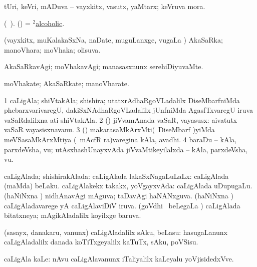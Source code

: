 \bentry
{}
\gl{\nA}
\bmng
tUri, keVri, mADuva -- vayxkitx, vasutx, yaMtarx; keVruva mora. 
\emng
\eentry

\bentry
{}
\gl{\nA} (\bava\ ). 
\bmng
(\ashi) = \hyperref{kandict_a.pdf}{A}{alcoholic(2)}{$^2$alcoholic}. 
\emng
\eentry

\bentry
{}
\gl{\gu}
\bmng
(vayxkitx, muKalakaSxNa, naDate, muguLanxge, \mo vugaLa \vi) AkaSaRka; manoVhara; moVhaka; olisuva. 
\emng
\eentry

\bentry
{}
\gl{\kirxvi}
\bmng
AkaSaRkavAgi; moVhakavAgi; manasasxnunx serehiDiyuvaMte. 
\emng
\eentry

\bentry
{}
\gl{\nA}
\bmng
moVhakate; AkaSaRkate; manoVharate. 
\emng
\eentry

\bentry
{} 
\gl{\nA}
\expl{}
\bmng
\bnum
\num{1} caLigAla; shiVtakAla; shishira; utatxrAdhaRgoVLadalilx DiseMbarfniMda phebarxvarivaregU, dakiSxNAdhaRgoVLadalilx jUnfniMda AgasfTxvaregU iruva vaSaRdalilxna ati shiVtakAla. 
\num{2} (\kAparx) jiVvamAnada vaSaR, vayasusx:  aivatutx vaSaR vayasisxnavanu. 
\num{3} (\Kavi) makarasaMkArxMti(\su\ DiseMbarf )yiMda meVSasaMkArxMtiya (\su\ mAcfR ra)varegina kAla, avadhi. 
\num{4} baraDu -- kAla, parxdeVsha, \mo vu; utAsxhashUnayxvAda jiVvaMtikeyilalxda -- kAla, parxdeVsha, \mo vu. 
\enum
\emng
\eentry

\bentry
{} 
\gl{\gu}
\bmng
caLigAlada; shishirakAlada: 
\banum
{} caLigAlada lakaSxNagaLuLaLx:  caLigAlada (maMda) beLaku. 
 caLigAlakekx takakx, yoVgayxvAda:  caLigAlada uDupugaLu. 
 (haNiNxna \vi) nidhAnavAgi mAguva; taDavAgi haNANxguva. 
 (haNiNxna \vi) caLigAladavarege yA caLigAlaviDiV iruva. 
 (goVdhi \mo\ beLegaLa \vi) caLigAlada bitatxneya; mAgikAladalilx koyilxge baruva. 
\eanum
\emng
\eentry

\bentry
{} 
\gl{\sakirx}
\bmng
(sasayx, danakaru, \mo vanunx) caLigAladalilx sAku, beLasu:  hasugaLanunx caLigAladalilx danada koTiTxgeyalilx kaTuTx, sAku, poVSisu. 
\emng

\noindent
\gl{\akirx}
\bmng
caLigAla kaLe:  nAvu caLigAlavanunx iTaliyalilx kaLeyalu yoVjisidedxVve. 
\emng
\eentry

